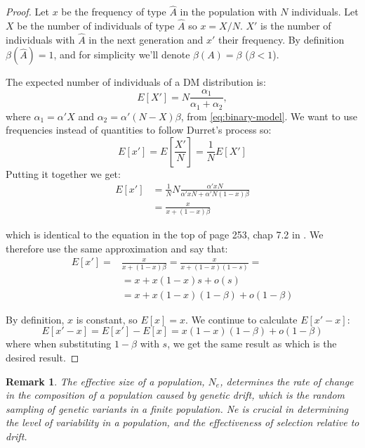 \documentclass[12pt]{extarticle}
\newtheorem{remark}{Remark}
\begin{document}
\begin{proof}
Let $x$ be the frequency of type $\hat{A}$ in the population with $N$ individuals. Let $X$ be the number of individuals of type $\hat{A}$ so $x=X/N$. $X'$ is the number of individuals with $\hat{A}$ in the next generation and $x'$ their frequency.
By definition $\beta(\hat{A})=1$, and for simplicity we'll denote $\beta(A)=\beta$ ($\beta<1$).

The expected number of individuals of a DM distribution is:
\begin{equation}
E[X'] = N  \frac{\alpha_1}{\alpha_1+\alpha_2},
\end{equation}
where $\alpha_1 = \alpha' X$ and $\alpha_2 = \alpha'(N-X)\beta$, from  \cref{eq:binary-model}.
We want to use frequencies instead of quantities to follow Durret's process so:
\begin{equation}
E[x'] = E[\frac{X'}{N}] = \frac{1}{N}E[X']
\end{equation}
Putting it together we get:
\begin{equation}
\begin{split}
E[x'] &= \frac{1}{N}N\frac{\alpha' xN}{\alpha' xN + \alpha' N (1-x)\beta}\\
	 &= \frac{x}{x + (1-x)\beta}
\end{split}
\end{equation}

which is identical to the equation in the top of page 253, chap 7.2 in \citet{durret}. We therefore use the same approximation and say that:
\begin{equation}
\begin{split}
E[x'] =& \frac{x}{x + (1-x)\beta} = \frac{x}{x + (1-x)(1-s)} =\\
 &= x + x(1-x)s + o(s)\\
  &= x + x(1-x)(1-\beta) + o(1-\beta)
\end{split}
\end{equation}

By definition, $x$ is constant, so $E[x] = x$. We continue to calculate $E[x'-x]$:
\begin{equation}\label{eq:expec_freq}
E[x'-x] = E[x'] - E[x] = x(1-x)(1-\beta) + o(1-\beta)
\end{equation}
where when substituting $1-\beta$ with $s$, we get the same result as \citet{durret} which is the desired result.
\end{proof}

\begin{remark}
The effective size of a population, $N_e$, determines the rate of change in the composition of a population caused by genetic drift, which is the random sampling of genetic variants in a finite population. Ne is crucial in determining the level of variability in a population, and the effectiveness of selection relative to drift.
\end{remark}
\end{document}
